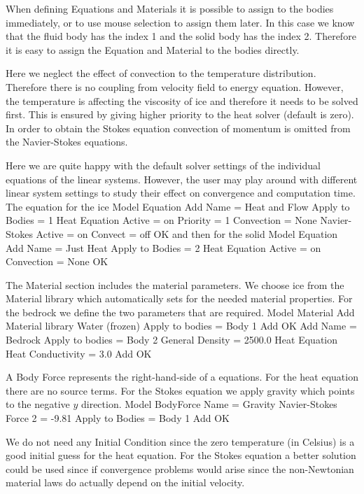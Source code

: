 When defining Equations and Materials it is possible to assign to the bodies immediately, or to use mouse
selection to assign them later. In this case we know that the fluid body has the index 1 and the 
solid body has the index 2. Therefore it is easy to assign the Equation and Material to the bodies directly. 

Here we neglect the effect of convection to the temperature distribution. Therefore there is no coupling 
from velocity field to energy equation. However, the temperature is affecting the viscosity of ice and therefore
it needs to be solved first. This is ensured by giving higher priority to the heat solver
(default is zero). In order to obtain the Stokes equation convection of momentum is omitted 
from the Navier-Stokes equations.	

Here we are quite happy with the default solver settings of the individual equations of the linear systems.
However, the user may play around with different linear system settings to study their effect on 
convergence and computation time.
\\
The equation for the ice
\ttbegin
Model
  Equation
    Add
    Name = Heat and Flow
    Apply to Bodies = 1
    Heat Equation
      Active = on
      Priority = 1
      Convection = None
    Navier-Stokes 
      Active = on
      Convect = off
    OK
\ttend        
and then for the solid
\ttbegin
Model
  Equation
    Add
    Name = Just Heat
    Apply to Bodies = 2
    Heat Equation
      Active = on
      Convection = None
    OK
\ttend    

The Material section includes the material parameters.
We choose ice from the Material library which automatically sets for the needed material properties. 
For the bedrock we define the two parameters that are required. 
\ttbegin
Model
  Material
    Add 
      Material library
        Water (frozen)
      Apply to bodies = Body 1 
      Add 
      OK
    Add
      Name = Bedrock
      Apply to bodies = Body 2
      General    
        Density = 2500.0
      Heat Equation
        Heat Conductivity = 3.0
      Add
      OK
\ttend


A Body Force represents the right-hand-side of a equations. For the heat equation there are
no source terms. For the Stokes equation we apply gravity which
points to the negative $y$ direction.
\ttbegin
Model
  BodyForce
    Name = Gravity
    Navier-Stokes
      Force 2 = -9.81
    Apply to Bodies = Body 1 
    Add
    OK
\ttend

We do not need any Initial Condition since the zero temperature (in Celsius) is a good initial
guess for the heat equation. For the Stokes equation a better solution could be used since 
if convergence problems would arise since the non-Newtonian material laws do actually depend on the 
initial velocity.


